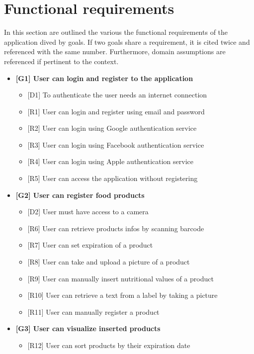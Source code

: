 \section{Functional requirements}
In this section are outlined the various the functional requirements of the application dived by goals. If two goals share a requirement, it is cited twice and referenced with the same number. Furthermore, domain assumptions are referenced if pertinent to the context.

\begin{itemize}
    \item \textbf{[G1] User can login and register to the application}
    \begin{itemize}
        \item {[D1] To authenticate the user needs an internet connection} 
        \item {[R1] User can login and register using email and password}
        \item {[R2] User can login using Google authentication service}
        \item {[R3] User can login using Facebook authentication service}
        \item {[R4] User can login using Apple authentication service}
        \item {[R5] User can access the application without registering}
    \end{itemize}
    \item \textbf{[G2] User can register food products}
    \begin{itemize}
        \item {[D2] User must have access to a camera}
        \item {[R6] User can retrieve products infos by scanning barcode}
        \item {[R7] User can set expiration of a product}
        \item {[R8] User can take and upload a picture of a product}
        \item {[R9] User can manually insert nutritional values of a product}
        \item {[R10] User can retrieve a text from a label by taking a picture}
        \item {[R11] User can manually register a product}
    \end{itemize}
    \item \textbf{[G3] User can visualize inserted products}
    \begin{itemize}
        \item {[R12] User can sort products by their expiration date}

\end{itemize}
\end{itemize}
